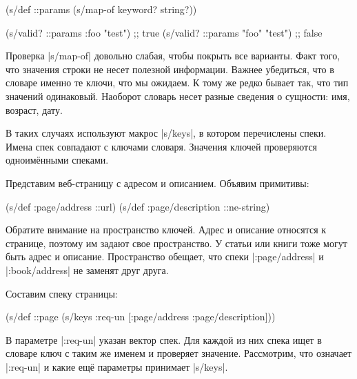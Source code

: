 \begin{english}
  \begin{clojure}
(s/def ::params
  (s/map-of keyword? string?))

(s/valid? ::params {:foo "test"})  ;; true
(s/valid? ::params {"foo" "test"}) ;; false
  \end{clojure}
\end{english}

Проверка \spverb|s/map-of| довольно слабая, чтобы покрыть все варианты. Факт
того, что значения строки не несет полезной информации. Важнее убедиться, что в
словаре именно те ключи, что мы ожидаем. К тому же редко бывает так, что тип
значений одинаковый. Наоборот словарь несет разные сведения о сущности: имя,
возраст, дату.


В таких случаях используют макрос \spverb|s/keys|, в котором перечислены
спеки. Имена спек совпадают с ключами словаря. Значения ключей проверяются
одноим\"{е}нными спеками.

Представим веб-страницу с адресом и описанием. Объявим примитивы:

\begin{english}
  \begin{clojure}
(s/def :page/address ::url)
(s/def :page/description ::ne-string)
  \end{clojure}
\end{english}


Обратите внимание на пространство ключей. Адрес и описание относятся к странице,
поэтому им задают свое пространство. У статьи или книги тоже могут быть адрес и
описание. Пространство обещает, что спеки \spverb|:page/address| и
\spverb|:book/address| не заменят друг друга.

Составим спеку страницы:

\begin{english}
  \begin{clojure}
(s/def ::page
  (s/keys :req-un [:page/address
                   :page/description]))
  \end{clojure}
\end{english}


В параметре \spverb|:req-un| указан вектор спек. Для каждой из них спека ищет в
словаре ключ с таким же именем и проверяет значение. Рассмотрим, что означает
\spverb|:req-un| и какие ещ\"{е} параметры принимает \spverb|s/keys|.

